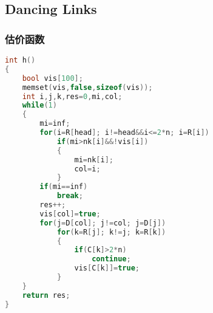 \subsection{Dancing Links}
    \subsubsection{估价函数}
	\begin{lstlisting}[language=c++]
int h()
{
    bool vis[100];
    memset(vis,false,sizeof(vis));
    int i,j,k,res=0,mi,col;
    while(1)
    {
        mi=inf;
        for(i=R[head]; i!=head&&i<=2*n; i=R[i])
            if(mi>nk[i]&&!vis[i])
            {
                mi=nk[i];
                col=i;
            }
        if(mi==inf)
            break;
        res++;
        vis[col]=true;
        for(j=D[col]; j!=col; j=D[j])
            for(k=R[j]; k!=j; k=R[k])
            {
                if(C[k]>2*n)
                    continue;
                vis[C[k]]=true;
            }
    }
    return res;
}
	\end{lstlisting}
	
